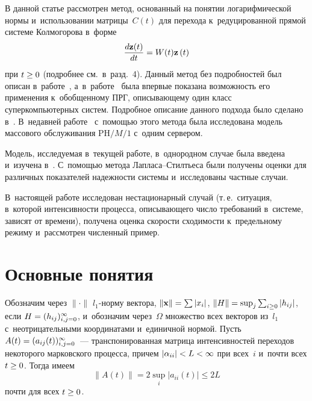 \begin{multicols}{2}
    В данной статье рассмотрен метод, основанный на понятии ло\-га\-риф\-ми\-че\-ской 
нор\-мы и~использовании мат\-ри\-цы~$C(t)$ для перехода к~редуцированной прямой 
сис\-те\-ме Колмогорова в~форме 
$$
\displaystyle\frac{\displaystyle d\mathbf{z}(t) \mathstrut}{\displaystyle dt\mathstrut}=W(t)\mathbf{z}\left(t\right)
$$ 
при  $t\hm\ge 0$ (по\-дроб\-нее см.\ в~разд.~4). Данный метод  без  
по\-дроб\-но\-стей был описан в~работе~\cite{Satin2021}, а~в~работе~\cite{Razumchik2022} была впер\-вые показана воз\-мож\-ность его применения 
к~обобщенному ПРГ, опи\-сы\-ва\-юще\-му один класс суперкомпьютерных 
сис\-тем. По\-дроб\-ное описание данного подхода было сделано в~\cite{KSSZ2022}. 
В~недавней работе~\cite{USZ2023} с~по\-мощью этого метода была 
исследована модель массового обслуживания $\mathrm{PH}/M/1$ с~одним сервером.
    
    Модель, ис\-сле\-ду\-емая в~текущей работе, в~однородном случае была введена 
    и~изуче\-на в~\cite{L2021}. С~по\-мощью метода Лап\-ла\-са--Стилть\-еса были получены оценки 
для раз\-лич\-ных показателей на\-деж\-ности сис\-те\-мы и~исследованы част\-ные случаи. 

В~на\-сто\-ящей работе исследован нестационарный случай (т.\,е.\ ситуация, в~которой   
интенсивности процесса, опи\-сы\-ва\-юще\-го чис\-ло требований в~сис\-те\-ме, зависят от 
времени), получена оцен\-ка ско\-рости схо\-ди\-мости к~предельному режиму 
и~рас\-смот\-рен чис\-лен\-ный пример.
    
\vspace*{-7pt}   

    \section{Основные понятия}
    
    \vspace*{-1pt}
    
        Обозначим через $ \|\cdot\| $ $l_1$-нор\-му век\-то\-ра, 
$\|\mathbf{x}\|\hm=\sum|x_i|$,
    $\|H\| \hm= \sup_j \sum_{i \geq 0} |h_{ij}|$, если $H \hm= 
(h_{ij})_{i,j=0}^{\infty}$, и~обозначим через~$\Omega $ множество всех векторов 
из~$l_1$ с~не\-от\-ри\-ца\-тель\-ны\-ми координатами и~единичной нормой. Пусть $A(t) \hm= 
(a_{ij}(t))_{i,j=0}^{\infty}$~--- транс\-по\-ни\-ро\-ван\-ная мат\-ри\-ца 
интенсивностей переходов некоторого марковского
    процесса, причем $|\alpha_{ii}| \hm< L \hm< \infty$ при всех~$i$ и~почти всех $t \hm\geq 0$. 
    Тогда имеем 
    $$
    \|A(t)\| = 2\sup_{i}\left|a_{ii}\left(t\right)\right| \le 2L
    $$ 
    почти для всех $t \hm\ge 0$.
    

\end{multicols}
